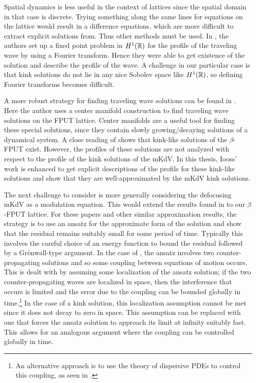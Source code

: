 Spatial dynamics is less useful in the context of lattices since the spatial domain in that case is discrete. Trying something along the same lines for equations on the lattice would result in a difference equations, which are more difficult to extract explicit solutions from. Thus other methods must be used. In \cite{friesecke1999solitary}, the authors set up a fixed point problem in \(H^1(\mathbb{R})\) for the profile of the traveling wave by using a Fourier transform. Hence they were able to get existence of the solution and describe the profile of the wave. A challenge in our particular case is that kink solutions do not lie in any nice Sobolev space like \(H^1(\mathbb{R})\), so defining Fourier transforms becomes difficult.

A more robust strategy for finding traveling wave solutions can be found in \cite{iooss2000travelling}. Here the author uses a center manifold construction to find traveling wave solutions on the FPUT lattice. Center manifolds are a useful tool for finding these special solutions, since they contain slowly growing/decaying solutions of a dynamical system. A close reading of \cite{iooss2000travelling} shows that kink-like solutions of the \(\beta\)-FPUT exist. However, the profiles of these solutions are not analyzed with respect to the profile of the kink solutions of the mKdV. In this thesis, Iooss' work is enhanced to get explicit descriptions of the profile for these kink-like solutions and show that they are well-approximated by the mKdV kink solutions.

The next challenge to consider is more generally considering the defocusing mKdV as a modulation equation. This would extend the results found in \cite{schneider2000counter,khan2017long} to our \(\beta\)-FPUT lattice. For these papers and other similar approximation results, the strategy is to use an ansatz for the approximate form of the solution and show that the residual remains suitably small for some period of time. Typically this involves the careful choice of an energy function  to bound the residual followed by a Gr\"onwall-type argument. In the case of \cite{schneider2000counter}, the ansatz involves two counter-propagating solutions and so some coupling between equations of motion occurs. This is dealt with by assuming some localization of the ansatz solution; if the two counter-propagating waves are localized in space, then the interference that occurs is limited and the error due to the coupling can be bounded globally in time.\footnote{An alternative approach is to use the theory of dispersive PDEs to control this coupling, as seen in \cite{hong2021korteweg}.} In the case of a kink solution, this localization assumption cannot be met since it does not decay to zero in space. This assumption can be replaced with one that forces the ansatz solution to approach its limit at infinity suitably fast. This allows for an analogous argument where the coupling can be controlled globally in time. 

